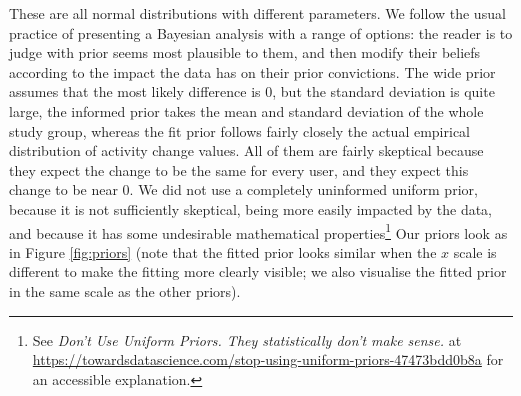 \documentclass[10pt,]{scrartcl}
\begin{document}
These are all normal distributions with different parameters. We follow
the usual practice of presenting a Bayesian analysis with a range of
options: the reader is to judge with prior seems most plausible to them,
and then modify their beliefs according to the impact the data has on
their prior convictions. The wide prior assumes that the most likely
difference is 0, but the standard deviation is quite large, the informed
prior takes the mean and standard deviation of the whole study group,
whereas the fit prior follows fairly closely the actual empirical
distribution of activity change values. All of them are fairly skeptical
because they expect the change to be the same for every user, and they
expect this change to be near 0. We did not use a completely uninformed
uniform prior, because it is not sufficiently skeptical, being more
easily impacted by the data, and because it has some undesirable
mathematical
properties\footnote{See \emph{Don’t Use Uniform Priors. They statistically don’t make sense.} at \url{https://towardsdatascience.com/stop-using-uniform-priors-47473bdd0b8a} for an accessible explanation.}
Our priors look as in Figure \ref{fig:priors} (note that the fitted
prior looks similar when the \(x\) scale is different to make the
fitting more clearly visible; we also visualise the fitted prior in the
same scale as the other priors).
\end{document}
